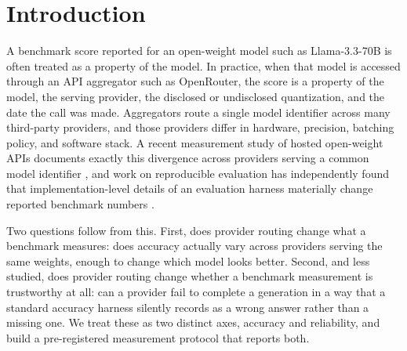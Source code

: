 \documentclass[11pt]{article}
\begin{document}
\begin{abstract}
further show that two apparent reliability findings dissolve under
audit: every silent-truncation candidate our detector flagged on a
second model was a complete, correct answer misclassified by a
formatting heuristic, and Provider~C's apparent 13.8\% silent-failure
rate on MMLU/8B is an artifact of how \texttt{finish\_reason} renders
a failure that peers also exhibit. A survey of eight candidate models
finds only two with enough multi-provider coverage for this kind of
study, itself evidence that wide multi-provider serving concentrates
on a few popular models. We release our harness, a reporting
checklist, and all raw per-call logs with checksums (link in the
Ethics Statement).
\end{abstract}

\section{Introduction}

A benchmark score reported for an open-weight model such as
Llama-3.3-70B is often treated as a property of the model. In
practice, when that model is accessed through an API aggregator such
as OpenRouter, the score is a property of the model, the serving
provider, the disclosed or undisclosed quantization, and the date the
call was made. Aggregators route a single model identifier across many
third-party providers, and those providers differ in hardware,
precision, batching policy, and software stack. A recent measurement
study of hosted open-weight APIs documents exactly this divergence
across providers serving a common model identifier
\citep{same_model_service2026}, and work on reproducible evaluation
has independently found that implementation-level details of an
evaluation harness materially change reported benchmark numbers
\citep{biderman2024lessons}.

Two questions follow from this. First, does provider routing change
what a benchmark measures: does accuracy actually vary across
providers serving the same weights, enough to change which model looks
better. Second, and less studied, does provider routing change whether
a benchmark measurement is trustworthy at all: can a provider fail to
complete a generation in a way that a standard accuracy harness
silently records as a wrong answer rather than a missing one. We treat
these as two distinct axes, accuracy and reliability, and build a
pre-registered measurement protocol that reports both.
\end{document}
